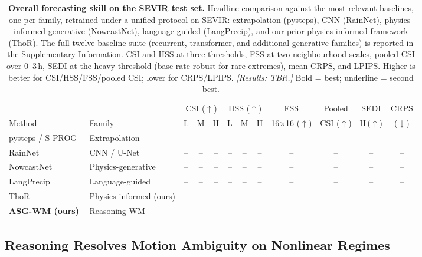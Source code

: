 \documentclass[fleqn,10pt]{wlscirep}
\begin{document}
\begin{table}[ht]
\centering
\caption{\textbf{Overall forecasting skill on the SEVIR test set.}
Headline comparison against the most relevant baselines, one per family, retrained under a unified protocol on SEVIR: extrapolation (pysteps), CNN (RainNet), physics-informed generative (NowcastNet), language-guided (LangPrecip), and our prior physics-informed framework (ThoR).
The full twelve-baseline suite (recurrent, transformer, and additional generative families) is reported in the Supplementary Information.
CSI and HSS at three thresholds, FSS at two neighbourhood scales, pooled CSI over 0--3\,h, SEDI at the heavy threshold (base-rate-robust for rare extremes), mean CRPS, and LPIPS.
Higher is better for CSI/HSS/FSS/pooled CSI; lower for CRPS/LPIPS.
\emph{[Results: TBR.]} Bold = best; underline = second best.}
\label{tab:skill}
\small
\setlength{\tabcolsep}{3.6pt}
\begin{tabular}{@{}llcccccccccc@{}}
\toprule
 & & \multicolumn{3}{c}{CSI ($\uparrow$)} & \multicolumn{3}{c}{HSS ($\uparrow$)} & FSS & Pooled & SEDI & CRPS \\
\cmidrule(lr){3-5}\cmidrule(lr){6-8}
Method & Family & L & M & H & L & M & H & 16${\times}$16 ($\uparrow$) & CSI ($\uparrow$) & H\,($\uparrow$) & ($\downarrow$) \\
\midrule
pysteps / S-PROG~\cite{pulkkinen2019pysteps} & Extrapolation & -- & -- & -- & -- & -- & -- & -- & -- & -- & -- \\
RainNet~\cite{ayzel2020rainnet} & CNN / U-Net & -- & -- & -- & -- & -- & -- & -- & -- & -- & -- \\
NowcastNet~\cite{zhang2023nowcastnet} & Physics-generative & -- & -- & -- & -- & -- & -- & -- & -- & -- & -- \\
LangPrecip~\cite{ling2025langprecip} & Language-guided & -- & -- & -- & -- & -- & -- & -- & -- & -- & -- \\
ThoR~\cite{ta2025thor} & Physics-informed (ours) & -- & -- & -- & -- & -- & -- & -- & -- & -- & -- \\
\midrule
\textbf{ASG-WM (ours)} & Reasoning WM & \textbf{--} & \textbf{--} & \textbf{--} & \textbf{--} & \textbf{--} & \textbf{--} & \textbf{--} & \textbf{--} & \textbf{--} & \textbf{--} \\
\bottomrule
\end{tabular}
\end{table}

\subsection*{Reasoning Resolves Motion Ambiguity on Nonlinear Regimes}
\end{document}
